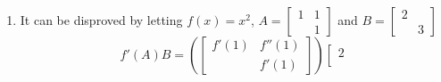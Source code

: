 \documentclass{article}
\begin{document}
\begin{enumerate}
\[\begin{array}{cc}
    \end{array}\right]=
    \left[\begin{array}{cc}
    (2A)^{k+1} & (k+1)\cdot 2^k A^{k+1} \\
     & (2A)^{k+1}
    \end{array}\right],S(k)\Rightarrow S(k+1)\]
    By first principle of induction, $\forall n:n\in \mathbf{Z}^+\Rightarrow S(n)$. $\blacksquare$\\
    So 
    \[f\left(\left[\begin{array}{cc}
    2A & A \\
     & 2A
    \end{array}\right]\right)= \sum_{k=0}^{+\infty} a_k \left[\begin{array}{cc}
    2A & A \\
     & 2A
    \end{array}\right]^k = \sum_{k=0}^{+\infty}\left[\begin{array}{cc}
    a_k (2A)^k & a_k\cdot k\cdot 2^{k-1} A^k \\
     & a_k (2A)^k
    \end{array}\right] \]
    Let $X=BJ B^{-1}$, then for  $p(x)=x^n$, $p'(X)=Bp'(J)B^{-1}$, $p'(J)= n J^{n-1}$, so $p'(X)=nX^{n-1}$
    \[\Rightarrow f'(X)=\sum_{k=1}^{+\infty} a_k\cdot k\cdot X^{k-1}\]
    \[\Rightarrow f\left(\left[\begin{array}{cc}
    2A & A \\
     & 2A
    \end{array}\right]\right) =\left[\begin{array}{cc}
    f(2A) & f'(A)A \\
     & f(2A)
    \end{array}\right]\Rightarrow B=f'(A)\cdot A.\]
    \item It can be disproved by letting $f(x)=x^2$, $A=\left[\begin{array}{cc}
    1 & 1 \\
     & 1
    \end{array}\right]$ and $B = \left[\begin{array}{cc}
    2 \\
     & 3
    \end{array}\right]$
    \[f'(A)B=\left(\left[\begin{array}{cc}
    f'(1) & f''(1) \\
     & f'(1)
    \end{array}\right]\right)\left[\begin{array}{cc}
    2  \\

\end{array}\]
\end{enumerate}
\end{document}
